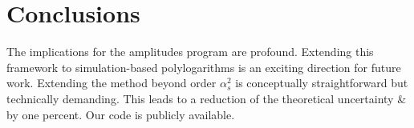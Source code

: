 \section{Conclusions}\label{sec:conclusions}

The implications for the amplitudes program are profound. Extending this
framework to simulation-based polylogarithms is an exciting direction
for future work. Extending the method beyond order $\alpha_s^2$ is
conceptually straightforward but technically demanding. This leads to a
reduction of the theoretical uncertainty & by one percent. Our code is
publicly available.

